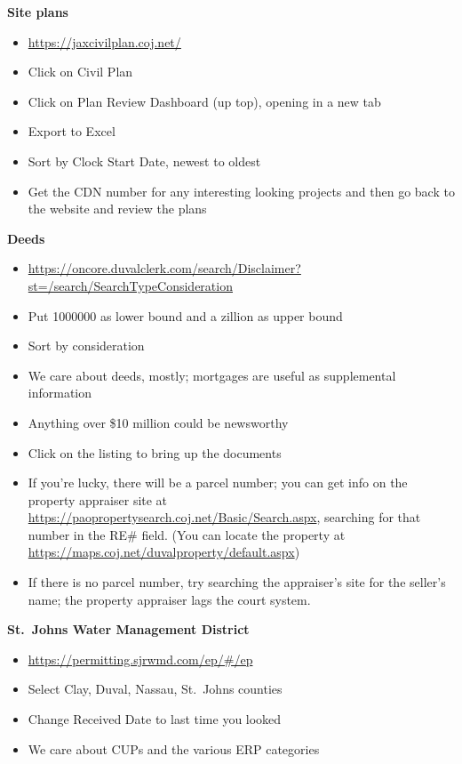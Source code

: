 \documentclass[
  12pt,
  american,
  letterpaperpaper,
  extrafontsizes,onecolumn,openright
  ]{memoir}
\providecommand{\tightlist}{%
  \setlength{\itemsep}{0pt}\setlength{\parskip}{0pt}}
\begin{document}
\textbf{Site plans}

\begin{itemize}
\tightlist
\item
  \url{https://jaxcivilplan.coj.net/}
\item
  Click on Civil Plan
\item
  Click on Plan Review Dashboard (up top), opening in a new tab
\item
  Export to Excel
\item
  Sort by Clock Start Date, newest to oldest
\item
  Get the CDN number for any interesting looking projects and then go back to the website and review the plans
\end{itemize}

\textbf{Deeds}

\begin{itemize}
\tightlist
\item
  \url{https://oncore.duvalclerk.com/search/Disclaimer?st=/search/SearchTypeConsideration}
\item
  Put 1000000 as lower bound and a zillion as upper bound
\item
  Sort by consideration
\item
  We care about deeds, mostly; mortgages are useful as supplemental information
\item
  Anything over \$10 million could be newsworthy
\item
  Click on the listing to bring up the documents
\item
  If you're lucky, there will be a parcel number; you can get info on the property appraiser site at \url{https://paopropertysearch.coj.net/Basic/Search.aspx}, searching for that number in the RE\# field. (You can locate the property at \url{https://maps.coj.net/duvalproperty/default.aspx})
\item
  If there is no parcel number, try searching the appraiser's site for the seller's name; the property appraiser lags the court system.
\end{itemize}

\textbf{St.~Johns Water Management District}

\begin{itemize}
\tightlist
\item
  \url{https://permitting.sjrwmd.com/ep/\#/ep}
\item
  Select Clay, Duval, Nassau, St.~Johns counties
\item
  Change Received Date to last time you looked
\item
  We care about CUPs and the various ERP categories
\end{itemize}
\end{document}
